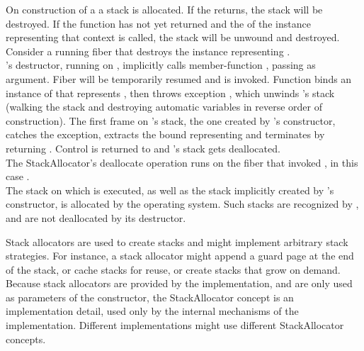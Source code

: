 \label{destruction}

On construction of a \fiber a stack is allocated. If the \entryfn\xspace returns,
the stack will be destroyed. If the function has not yet returned and the
 of the \fiber instance representing that context is called,
the stack will be unwound and destroyed.\\

Consider a running fiber  that destroys the \fiber instance
representing .\\

's destructor, running on , implicitly calls member-function
\resumewith, passing \unwindfib as
argument. Fiber  will be temporarily resumed and \unwindfib is
invoked. Function \unwindfib binds an instance of \fiber that
represents , then throws exception \unwindex, which
unwinds 's stack
(walking the stack and destroying automatic variables in reverse order of
construction).
The first frame on 's stack, the one created by \fiber's constructor,
catches the exception,
extracts the bound \fiber representing  and terminates  by returning
. Control is returned to  and 's
stack gets deallocated.\\

The StackAllocator's deallocate operation runs on the fiber that invoked
\dtor, in this case .\\

The stack on which  is executed, as well as the stack implicitly
created by \thread's constructor, is allocated by the operating
system. Such stacks are recognized by \fiber, and are not deallocated by its
destructor.


\label{stackalloc}

Stack allocators are used to create stacks and might implement arbitrary stack
strategies. For instance, a stack allocator might append a guard page at the end
of the stack, or cache stacks for reuse, or create stacks that grow on demand.\\

Because stack allocators are provided by the implementation, and are only used
as parameters of the constructor, the StackAllocator concept is an
implementation detail, used only by the internal mechanisms of the
implementation. Different implementations might use different StackAllocator
concepts.\\

